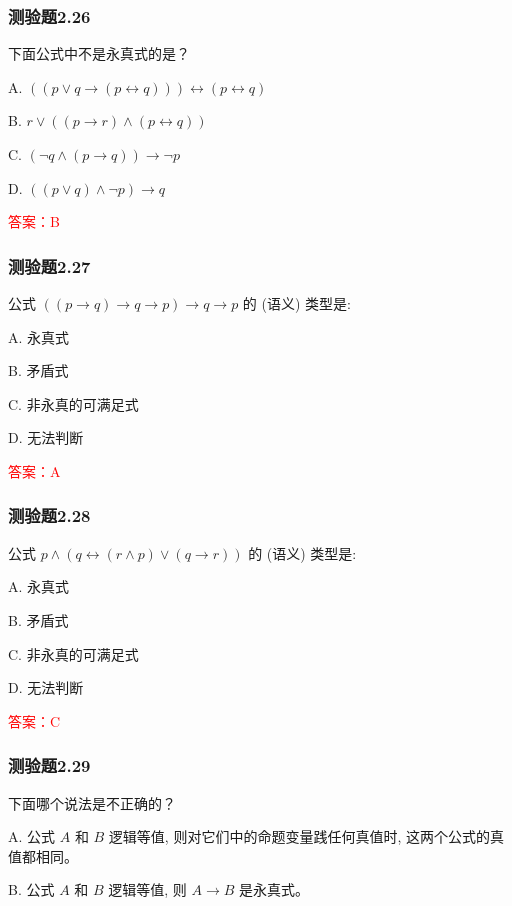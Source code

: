\documentclass[UTF8, heading=true]{ctexart}
\begin{document}
\subsubsection{测验题2.26}

下面公式中不是永真式的是？

A. $((p \vee q \rightarrow(p \leftrightarrow q))) \leftrightarrow(p \leftrightarrow q)$

B. $ r \vee((p \rightarrow r) \wedge(p \leftrightarrow q))$

C. $(\neg q \wedge(p \rightarrow q)) \rightarrow \neg p$

D. $((p \vee q) \wedge \neg p) \rightarrow q$

\textcolor{red}{答案：B}

\subsubsection{测验题2.27}

公式 $((p \rightarrow q) \rightarrow q \rightarrow p) \rightarrow q \rightarrow p$ 的 (语义) 类型是: $\qquad$

A. 永真式

B. 矛盾式

C. 非永真的可满足式

D. 无法判断

\textcolor{red}{答案：A}

\subsubsection{测验题2.28}

公式 $p \wedge(q \leftrightarrow(r \wedge p) \vee(q \rightarrow r))$ 的 (语义) 类型是: $\qquad$

A. 永真式

B.  矛盾式

C.   非永真的可满足式

D. 无法判断

\textcolor{red}{答案：C}

\subsubsection{测验题2.29}

下面哪个说法是不正确的？

A. 公式 $A$ 和 $B$ 逻辑等值, 则对它们中的命题变量践任何真值时, 这两个公式的真值都相同。

B. 公式 $A$ 和 $B$ 逻辑等值, 则 $A \rightarrow B$ 是永真式。
\end{document}

